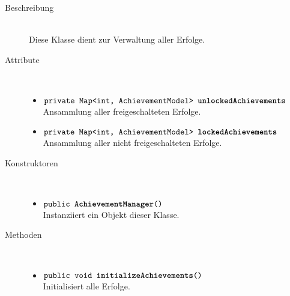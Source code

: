 		\begin{description}
		\item[Beschreibung] \hfill \\ Diese Klasse dient zur Verwaltung aller Erfolge.
		\item[Attribute] \hfill \\
			\vspace{-.8cm}
			\begin{itemize}
				\item $\texttt{private Map<int, AchievementModel> \textbf{unlockedAchievements}}$ \\ Ansammlung aller freigeschalteten Erfolge.
				\item $\texttt{private Map<int, AchievementModel> \textbf{lockedAchievements}}$ \\ Ansammlung aller nicht freigeschalteten Erfolge.
			\end{itemize}
			
		\item[Konstruktoren] \hfill \\
			\vspace{-.8cm}
			\begin{itemize}
				\item $\texttt{public \textbf{AchievementManager}()}$ \\ Instanziiert ein Objekt dieser Klasse.
			\end{itemize}
			
		\item[Methoden] \hfill \\
			\vspace{-.8cm}
			\begin{itemize}
			
				\item $\texttt{public void \textbf{initializeAchievements}()}$ \\ Initialisiert alle Erfolge.
			

\end{itemize}
\end{description}
